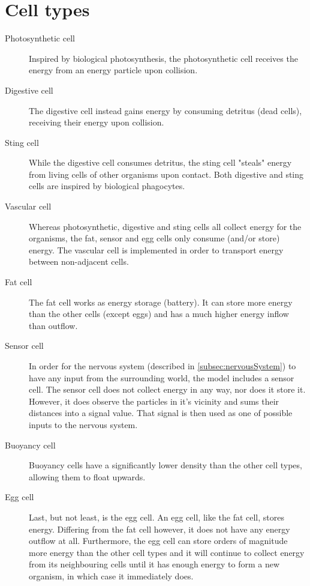 \section{Cell types}
\begin{description}
    \item [Photosynthetic cell] Inspired by biological photosynthesis, the photosynthetic cell receives the energy from an energy particle upon collision.
    \item [Digestive cell] %
    The digestive cell instead gains energy by consuming detritus (dead cells), receiving their energy upon collision.
    \item [Sting cell] %
    While the digestive cell consumes detritus, the sting cell "steals" energy from living cells of other organisms upon contact. Both digestive and sting cells are inspired by biological phagocytes.
    \item [Vascular cell] Whereas photosynthetic, digestive and sting cells all collect energy for the organisms, the fat, sensor and egg cells only consume (and/or store) energy. The vascular cell is implemented in order to transport energy between non-adjacent cells.
    \item [Fat cell] The fat cell works as energy storage (battery). It can store more energy than the other cells (except eggs) and has a much higher energy inflow than outflow.
    \item [Sensor cell] In order for the nervous system (described in \ref{subsec:nervousSystem}) to have any input from the surrounding world, the model includes a sensor cell. The sensor cell does not collect energy in any way, nor does it store it. However, it does observe the particles in it's vicinity and sums their distances into a signal value. That signal is then used as one of possible inputs to the nervous system.
    \item [Buoyancy cell] Buoyancy cells have a significantly lower density than the other cell types, allowing them to float upwards. 
    \item [Egg cell] Last, but not least, is the egg cell. An egg cell, like the fat cell, stores energy. Differing from the fat cell however, it does not have any energy outflow at all. Furthermore, the egg cell can store orders of magnitude more energy than the other cell types and it will continue to collect energy from its neighbouring cells until it has enough energy to form a new organism, in which case it immediately does.
\end{description}

